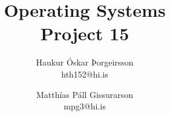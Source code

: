 \documentclass[10pt,a4paper]{article}
\begin{document}
\title{Operating Systems\\Project 15}
\author{Haukur Óskar Þorgeirsson\\hth152@hi.is \and Matthías Páll Gissurarson\\mpg3@hi.is}
\maketitle


\end{document}
